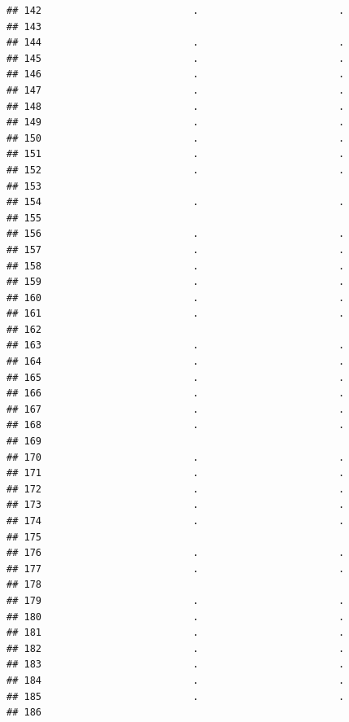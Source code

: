 \documentclass[
]{article}
\begin{document}
\begin{verbatim}
## 142                          .                        .
## 143                                                    
## 144                          .                        .
## 145                          .                        .
## 146                          .                        .
## 147                          .                        .
## 148                          .                        .
## 149                          .                        .
## 150                          .                        .
## 151                          .                        .
## 152                          .                        .
## 153                                                    
## 154                          .                        .
## 155                                                    
## 156                          .                        .
## 157                          .                        .
## 158                          .                        .
## 159                          .                        .
## 160                          .                        .
## 161                          .                        .
## 162                                                    
## 163                          .                        .
## 164                          .                        .
## 165                          .                        .
## 166                          .                        .
## 167                          .                        .
## 168                          .                        .
## 169                                                    
## 170                          .                        .
## 171                          .                        .
## 172                          .                        .
## 173                          .                        .
## 174                          .                        .
## 175                                                    
## 176                          .                        .
## 177                          .                        .
## 178                                                    
## 179                          .                        .
## 180                          .                        .
## 181                          .                        .
## 182                          .                        .
## 183                          .                        .
## 184                          .                        .
## 185                          .                        .
## 186                                                    

\end{verbatim}
\end{document}
